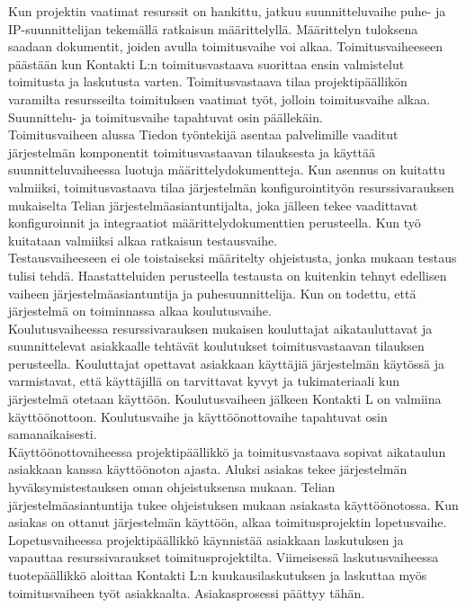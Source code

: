 \documentclass[finnish,12pt,a4paper,pdftex]{article}
\begin{document}
Kun projektin vaatimat resurssit on hankittu, jatkuu suunnitteluvaihe puhe- ja IP-suunnittelijan tekemällä ratkaisun määrittelyllä. Määrittelyn tuloksena saadaan dokumentit, joiden avulla toimitusvaihe voi alkaa. Toimitusvaiheeseen päästään kun Kontakti L:n toimitusvastaava suorittaa ensin valmistelut toimitusta ja laskutusta varten. Toimitusvastaava tilaa projektipäällikön varamilta resursseilta toimituksen vaatimat työt, jolloin toimitusvaihe alkaa. Suunnittelu- ja toimitusvaihe tapahtuvat osin päällekäin.\\

Toimitusvaiheen alussa Tiedon työntekijä asentaa palvelimille vaaditut järjestelmän komponentit toimitusvastaavan tilauksesta ja käyttää suunnitteluvaiheessa luotuja määrittelydokumentteja. Kun asennus on kuitattu valmiiksi, toimitusvastaava tilaa järjestelmän konfigurointityön resurssivarauksen mukaiselta Telian järjestelmäasiantuntijalta, joka jälleen tekee vaadittavat konfiguroinnit ja integraatiot määrittelydokumenttien perusteella. Kun työ kuitataan valmiiksi alkaa ratkaisun testausvaihe.\\

Testausvaiheeseen ei ole toistaiseksi määritelty ohjeistusta, jonka mukaan testaus tulisi tehdä. Haastatteluiden perusteella testausta on kuitenkin tehnyt edellisen vaiheen järjestelmäasiantuntija ja puhesuunnittelija. Kun on todettu, että järjestelmä on toiminnassa alkaa koulutusvaihe.\\

Koulutusvaiheessa resurssivarauksen mukaisen kouluttajat aikatauluttavat ja suunnittelevat asiakkaalle tehtävät koulutukset toimitusvastaavan tilauksen perusteella. Kouluttajat opettavat asiakkaan käyttäjiä järjestelmän käytössä ja varmistavat, että käyttäjillä on tarvittavat kyvyt ja tukimateriaali kun järjestelmä otetaan käyttöön. Koulutusvaiheen jälkeen Kontakti L on valmiina käyttöönottoon. Koulutusvaihe ja käyttöönottovaihe tapahtuvat osin samanaikaisesti.\\

Käyttöönottovaiheessa projektipäällikkö ja toimitusvastaava sopivat aikataulun asiakkaan kanssa käyttöönoton ajasta. Aluksi asiakas tekee järjestelmän hyväksymistestauksen oman ohjeistuksensa mukaan. Telian järjestelmäasiantuntija tukee ohjeistuksen mukaan asiakasta käyttöönotossa. Kun asiakas on ottanut järjestelmän käyttöön, alkaa toimitusprojektin lopetusvaihe.\\

Lopetusvaiheessa projektipäällikkö käynnistää asiakkaan laskutuksen ja vapauttaa resurssivaraukset toimitusprojektilta. Viimeisessä laskutusvaiheessa tuotepäällikkö aloittaa Kontakti L:n kuukausilaskutuksen ja laskuttaa myös toimitusvaiheen työt asiakkaalta. Asiakasprosessi päättyy tähän.\\
\end{document}
